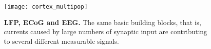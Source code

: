 \documentclass[preprint,11pt,authoryear]{elsarticle}
\begin{document}
\begin{figure}[!ht]
\begin{center}
\texttt{[image: cortex\_multipop]}
\end{center}
\caption{\textbf{LFP, ECoG and EEG.} The same basic building blocks, that is, currents caused by large numbers of synaptic input are contributing to several different measurable signals.
}
\label{fig:multimodal}
\end{figure}






%
\end{document}
